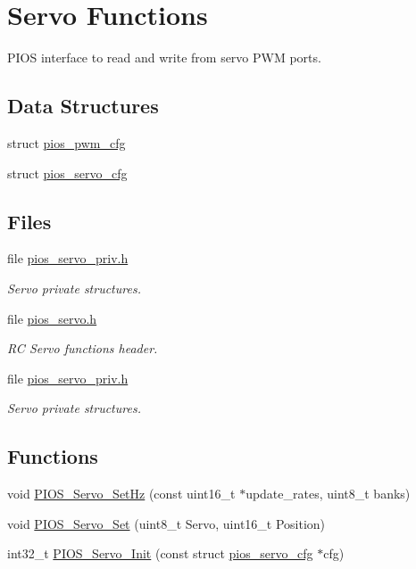 \hypertarget{group___p_i_o_s___s_e_r_v_o}{\section{\-Servo \-Functions}
\label{group___p_i_o_s___s_e_r_v_o}
}


\-P\-I\-O\-S interface to read and write from servo \-P\-W\-M ports.  


\subsection*{\-Data \-Structures}
\begin{DoxyCompactItemize}
\item 
struct \hyperlink{structpios__pwm__cfg}{pios\-\_\-pwm\-\_\-cfg}
\item 
struct \hyperlink{structpios__servo__cfg}{pios\-\_\-servo\-\_\-cfg}
\end{DoxyCompactItemize}
\subsection*{\-Files}
\begin{DoxyCompactItemize}
\item 
file \hyperlink{pios__servo__priv_8h}{pios\-\_\-servo\-\_\-priv.\-h}
\begin{DoxyCompactList}\small\item\em \-Servo private structures. \end{DoxyCompactList}\item 
file \hyperlink{pios__servo_8h}{pios\-\_\-servo.\-h}
\begin{DoxyCompactList}\small\item\em \-R\-C \-Servo functions header. \end{DoxyCompactList}\item 
file \hyperlink{pios__servo__priv_8h}{pios\-\_\-servo\-\_\-priv.\-h}
\begin{DoxyCompactList}\small\item\em \-Servo private structures. \end{DoxyCompactList}\end{DoxyCompactItemize}
\subsection*{\-Functions}
\begin{DoxyCompactItemize}
\item 
void \hyperlink{group___p_i_o_s___s_e_r_v_o_gacc20fb520926dba9214e34206d9c6e88}{\-P\-I\-O\-S\-\_\-\-Servo\-\_\-\-Set\-Hz} (const uint16\-\_\-t $\ast$update\-\_\-rates, uint8\-\_\-t banks)
\item 
void \hyperlink{group___p_i_o_s___s_e_r_v_o_ga9191a380c1c605a4cab312e5d850b58f}{\-P\-I\-O\-S\-\_\-\-Servo\-\_\-\-Set} (uint8\-\_\-t \-Servo, uint16\-\_\-t \-Position)
\item 
int32\-\_\-t \hyperlink{group___p_i_o_s___s_e_r_v_o_ga9d74027bc92b7db6f1b0dc049ba1625d}{\-P\-I\-O\-S\-\_\-\-Servo\-\_\-\-Init} (const struct \hyperlink{structpios__servo__cfg}{pios\-\_\-servo\-\_\-cfg} $\ast$cfg)
\end{DoxyCompactItemize}
